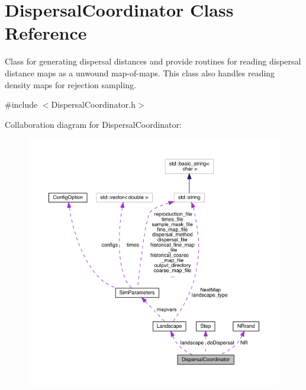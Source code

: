 \hypertarget{class_dispersal_coordinator}{}\section{Dispersal\+Coordinator Class Reference}
\label{class_dispersal_coordinator}


Class for generating dispersal distances and provide routines for reading dispersal distance maps as a unwound map-\/of-\/maps. This class also handles reading density maps for rejection sampling.  




{\ttfamily \#include $<$Dispersal\+Coordinator.\+h$>$}



Collaboration diagram for Dispersal\+Coordinator\+:\nopagebreak
\begin{figure}[H]
\begin{center}
\leavevmode
\includegraphics[width=350pt]{class_dispersal_coordinator__coll__graph}
\end{center}
\end{figure}

